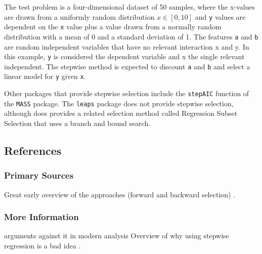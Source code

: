 The test problem is a four-dimensional dataset of 50 samples, where the x-values are drawn from a uniformly random distribution $x \in [0,10]$ and \texttt{y} values are dependent on the \texttt{x} value plus a value drawn from a normally random distribution with a mean of 0 and a standard deviation of 1. The features \texttt{a} and \texttt{b} are random independent variables that have no relevant interaction x and y. In this example, \texttt{y} is considered the dependent variable and x the single relevant independent. The stepwise method is expected to discount \texttt{a} and \texttt{b} and select a linear model for \texttt{y} given \texttt{x}.




Other packages that provide stepwise selection include the \texttt{stepAIC} function of the \texttt{MASS} package. The \texttt{leaps} package does not provide stepwise selection, although does provides a related selection method called Regression Subset Selection that uses a branch and bound search.


\subsection{References}

\subsubsection{Primary Sources}


Great early overview of the approaches (forward and backward selection) \cite{Hocking1976}.

\subsubsection{More Information}

arguments against it in modern analysis
Overview of why using stepwise regression is a bad idea \cite{Whittingham2006}.
\cite{Mundry2009}





